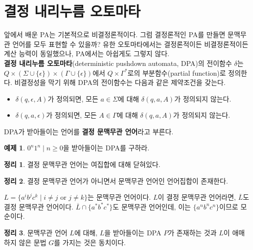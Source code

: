 \documentclass[b5paper]{book}
\theoremstyle{definition}
\newtheorem{thm}{정리}[chapter]
\newtheorem{ex}{예제}[chapter]
\newenvironment{pf*}{\pushQED{\qed}\pf}{\popQED\endpf}
\begin{document}
\section{결정 내리누름 오토마타}
앞에서 배운 PA는 기본적으로 비결정론적이다. 그럼 결정론적인 PA를 만들면 문맥무관 언어를 모두 표현할
수 있을까? 유한 오토마타에서는 결정론적이든 비결정론적이든 계산 능력이 동일했으나, 
PA에서는 아쉽게도 그렇지 않다. \\
\textbf{결정 내리누름 오토마타}(deterministic pushdown automata, DPA)의 전이함수
$\delta$는 $Q \times (\Sigma\cup \{\epsilon\}) \times (\Gamma \cup \{\epsilon\})$에서 
$Q \times \Gamma^*$로의 부분함수(partial function)로 정의한다. 비결정성을 막기 위해 DPA의
전이함수는 다음과 같은 제약조건을 갖는다. 
\begin{itemize}
    \item $\delta(q,\epsilon,A)$가 정의되면, 모든 $a \in \Sigma$에 대해 $\delta(q,a,A)$가
    정의되지 않는다.
    \item $\delta(q,a,\epsilon)$가 정의되면, 모든 $A \in \Gamma$에 대해 $\delta(q,a,A)$가
    정의되지 않는다. 
\end{itemize}
DPA가 받아들이는 언어를 \textbf{결정 문맥무관 언어}라고 부른다. 
\begin{ex}
    ${0^n1^n \;\vert\; n \ge 0}$을 받아들이는 DPA를 구하라. 
\end{ex}
\begin{thm}
    결정 문맥무관 언어는 여집합에 대해 닫혀있다. 
\end{thm}
\begin{thm}
    결정 문맥무관 언어가 아니면서 문맥무관 언어인 언어집합이 존재한다. 
\end{thm}
\begin{pf*}
    $L = \{ a^ib^jc^k \;\vert\; i \neq j \text{ or } j \neq k \}$는 문맥무관 언어이다.
    $L$이 결정 문맥무관 언어라면, $\overline{L}$도 결정 문맥무관 언어이다. $\overline{L} \cap
    \{a^*b^*c^*\}$도 문맥무관 언어인데, 이는 $\{a^nb^nc^n\}$이므로 모순이다. 
\end{pf*}
\begin{thm}
    문맥무관 언어 $L$에 대해, $L$을 받아들이는 DPA $P$가 존재하는 것과 $L$이 애매하지 않은 문법 
    $G$를 가지는 것은 동치이다. 
\end{thm}
\end{document}
